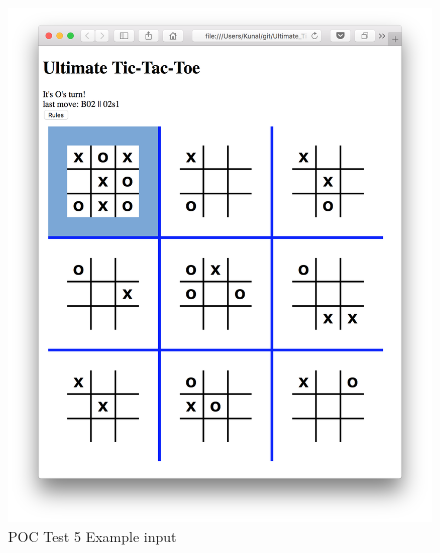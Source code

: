 \documentclass[12pt, titlepage]{article}
\begin{document}
\begin{figure}
  \includegraphics[width=\linewidth]{Figures/Test5-input.png}
  \caption{POC Test 5 Example input}
  \label{fig:Test5_intput}
\end{figure}
\end{document}
